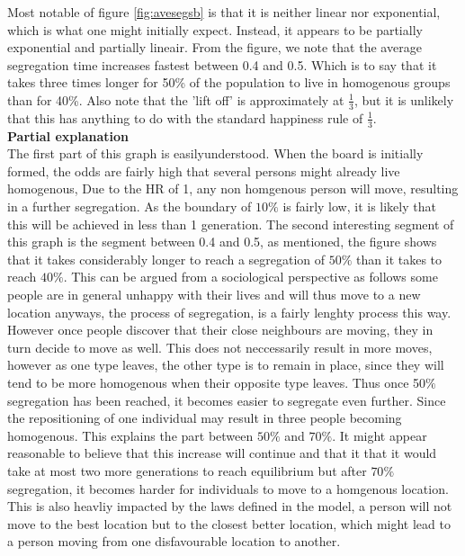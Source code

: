 Most notable of figure \ref{fig:avesegsb} is that it is neither linear nor exponential, which is what one might initially expect. Instead, it appears to be partially exponential and partially lineair. From the figure, we note that the average segregation time increases fastest between 0.4 and 0.5. 
Which is to say that it takes three times longer for 50\% of the population to live in homogenous groups than for 40\%.
Also note that the 'lift off' is approximately at $\frac{1}{3}$, but it is unlikely that this has anything to do with the standard happiness rule of $\frac{1}{3}$.\\

\textbf{Partial explanation} \\
The first part of this graph is easilyunderstood. 
When the board is initially formed, the odds are fairly high that several persons might already live homogenous, Due to the HR of 1, any non homgenous person will move, resulting in a further segregation. As the boundary of \(10\%\) is fairly low, it is likely that this will be achieved in less than 1 generation. 
The second interesting segment of this graph is the segment between 0.4 and 0.5, as mentioned, the figure shows that it takes considerably longer to reach a segregation of \(50\%\) than it takes to reach \(40\%\). 
This can be argued from a sociological perspective as follows some people are in general unhappy with their lives and will thus move to a new location anyways, the process of segregation, is a fairly lenghty process this way. However once people discover that their close neighbours are moving, they in turn decide to move as well. 
This does not neccessarily result in more moves, however as one type leaves, the other type is to remain in place, since they will tend to be more homogenous when their opposite type leaves.
Thus once 50$\%$ segregation has been reached, it becomes easier to segregate even further. Since the repositioning of one individual may result in three people becoming homogenous. This explains the part between $50\%$ and $70\%$. It might appear reasonable to believe that this increase will continue and that it that it would take at most two more generations to reach equilibrium but after $70\%$ segregation, it becomes harder for individuals to move to a homgenous location.
 This is also heavliy impacted by the laws defined in the model, a person will not move to the best location but to the closest better location, which might lead to a person moving from one disfavourable location to another. \\

